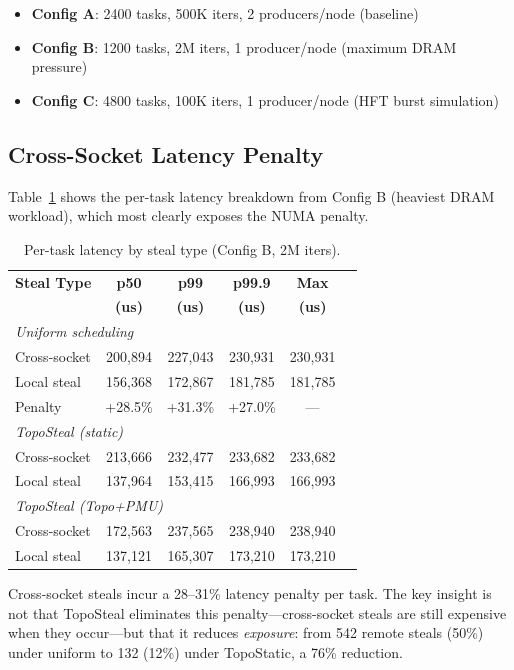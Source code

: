\documentclass[conference]{IEEEtran}
\begin{document}
\begin{itemize}
    \item \textbf{Config A}: 2400 tasks, 500K iters, 2 producers/node (baseline)
    \item \textbf{Config B}: 1200 tasks, 2M iters, 1 producer/node (maximum DRAM pressure)
    \item \textbf{Config C}: 4800 tasks, 100K iters, 1 producer/node (HFT burst simulation)
\end{itemize}

\subsection{Cross-Socket Latency Penalty}

Table~\ref{tab:latency} shows the per-task latency breakdown from Config B (heaviest DRAM workload), which most clearly exposes the NUMA penalty.

\begin{table}[h]
\centering
\caption{Per-task latency by steal type (Config B, 2M iters).}
\small
\begin{tabular}{lccccc}
\toprule
\textbf{Steal Type} & \textbf{p50} & \textbf{p99} & \textbf{p99.9} & \textbf{Max} \\
 & \textbf{(us)} & \textbf{(us)} & \textbf{(us)} & \textbf{(us)} \\
\midrule
\multicolumn{5}{l}{\emph{Uniform scheduling}} \\
\quad Cross-socket & 200,894 & 227,043 & 230,931 & 230,931 \\
\quad Local steal  & 156,368 & 172,867 & 181,785 & 181,785 \\
\quad Penalty      & +28.5\% & +31.3\% & +27.0\% & --- \\
\midrule
\multicolumn{5}{l}{\emph{TopoSteal (static)}} \\
\quad Cross-socket & 213,666 & 232,477 & 233,682 & 233,682 \\
\quad Local steal  & 137,964 & 153,415 & 166,993 & 166,993 \\
\midrule
\multicolumn{5}{l}{\emph{TopoSteal (Topo+PMU)}} \\
\quad Cross-socket & 172,563 & 237,565 & 238,940 & 238,940 \\
\quad Local steal  & 137,121 & 165,307 & 173,210 & 173,210 \\
\bottomrule
\end{tabular}
\label{tab:latency}
\end{table}

Cross-socket steals incur a 28--31\% latency penalty per task. The key insight is not that TopoSteal eliminates this penalty---cross-socket steals are still expensive when they occur---but that it reduces \emph{exposure}: from 542 remote steals (50\%) under uniform to 132 (12\%) under TopoStatic, a 76\% reduction.
\end{document}
